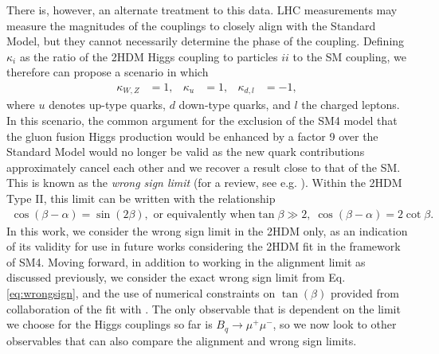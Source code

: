 \documentclass[a4paper,12pt]{article}
\begin{document}
There is, however, an alternate treatment to this data. 
LHC measurements may measure the magnitudes of the couplings to closely align with the Standard Model, but they cannot necessarily determine the phase of the coupling. 
Defining $\kappa_i$ as the ratio of the 2HDM Higgs coupling to particles $ii$ to the SM coupling, we therefore can propose a scenario in which 
\begin{align}
    \kappa_{W,Z} &= 1, & \kappa_u &= 1, & \kappa_{d,l} &= -1,
\end{align}
where $u$ denotes up-type quarks, $d$ down-type quarks, and $l$ the charged leptons.
In this scenario, the common argument for the exclusion of the SM4 model that the gluon fusion Higgs production would be enhanced by a factor 9 over the Standard Model would no longer be valid as the new quark contributions approximately cancel each other and we recover a result close to that of the SM.
This is known as the \emph{wrong sign limit} (for a review, see e.g. \cite{wrong1,wrong2}).
Within the 2HDM Type II, this limit can be written with the relationship
\begin{align}
    \label{eq:wrongsign}
    \cos(\beta-\alpha) = \sin(2\beta), \text{ or equivalently when} \tan\beta\gg2,\; \cos(\beta-\alpha) = 2\cot\beta.
\end{align}
In this work, we consider the wrong sign limit in the 2HDM only, as an indication of its validity for use in future works considering the 2HDM fit in the framework of SM4. 
Moving forward, in addition to working in the alignment limit as discussed previously, we consider the exact wrong sign limit from Eq. \ref{eq:wrongsign}, and the use of numerical constraints on $\tan(\beta)$ provided from collaboration of the fit with \cite{oliver}.
The only observable that is dependent on the limit we choose for the Higgs couplings so far is $B_q\to\mu^+\mu^-$, so we now look to other observables that can also compare the alignment and wrong sign limits.
\end{document}
